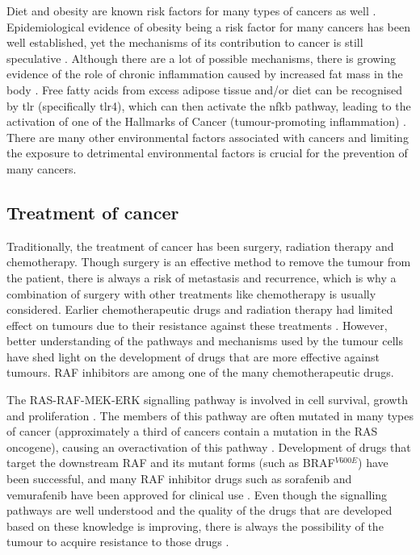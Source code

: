Diet and obesity are known risk factors for many types of cancers as well \citep{Ames1995,Calle2004}.
Epidemiological evidence of obesity being a risk factor for many cancers has been well established, yet the mechanisms of its contribution to cancer is still  speculative \citep{Calle2003,Kelesidis2006}.
Although there are a lot of possible mechanisms, there is growing evidence of the role of chronic inflammation caused by increased fat mass in the body \citep{Kelesidis2006,Lumeng2011,Hernandez2013}.
Free fatty acids from excess adipose tissue and/or diet can be recognised by \gls{tlr} (specifically \gls{tlr}4), which can then activate the \gls{nfkb} pathway, leading to the activation of one of the Hallmarks of Cancer (tumour-promoting inflammation) \citep{Lumeng2011}.
There are many other environmental factors associated with cancers and limiting the exposure to detrimental environmental factors is crucial for the prevention of many cancers.

\subsection{Treatment of cancer}
\label{sub:treatment_of_cancer}

Traditionally, the treatment of cancer has been surgery, radiation therapy and chemotherapy.
Though surgery is an effective method to remove the tumour from the patient, there is always a risk of metastasis and recurrence, which is why a combination of surgery with other treatments like chemotherapy is usually considered.
Earlier chemotherapeutic drugs and radiation therapy had limited effect on tumours due to their resistance against these treatments \citep{Wilhelm2006}.
However, better understanding of the pathways and mechanisms used by the tumour cells have shed  light on the development of drugs that are more effective against tumours.
RAF inhibitors are among one of the many chemotherapeutic drugs.

The RAS-RAF-MEK-ERK signalling pathway is  involved in cell survival, growth and proliferation \citep{Samatar2014,Wilhelm2006}.
The members of this pathway are often mutated in many types of cancer (approximately a third of cancers contain a mutation in the RAS oncogene), causing an overactivation of this pathway \citep{Samatar2014}.
Development of drugs that target  the downstream RAF and its mutant forms (such as BRAF$^{V600E}$) have been successful, and many RAF inhibitor drugs such as sorafenib and vemurafenib have been approved for clinical use \citep{Samatar2014,Wilhelm2006}.
Even though the signalling pathways are well understood and the quality of the drugs that are developed based on these knowledge is improving, there is always the possibility of the tumour to acquire resistance to those drugs \citep{Samatar2014}.

